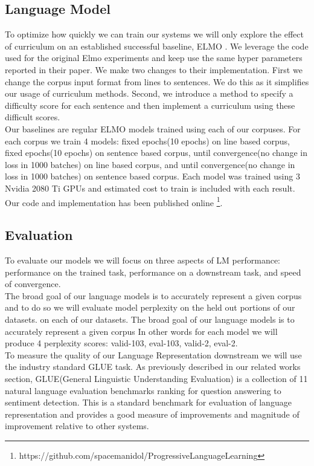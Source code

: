 \subsection{Language Model}
To optimize how quickly we can train our systems we will only explore the effect of curriculum on an established successful baseline, ELMO \cite{Smith2019ContextualWR}. We leverage the code used for the original Elmo experiments and keep use the same hyper parameters reported in their paper. We make two changes to their implementation. First we change the corpus input format from lines to sentences. We do this as it simplifies our usage of curriculum methods. Second, we introduce a method to specify a difficulty score for each sentence and then implement a curriculum using these difficult scores. \\
Our baselines are regular ELMO models trained using each of our corpuses. For each corpus we train 4 models: fixed epochs(10 epochs) on line based corpus, fixed epochs(10 epochs) on sentence based corpus, until convergence(no change in loss in 1000 batches) on line based corpus, and until convergence(no change in loss in 1000 batches) on sentence based corpus. Each model was trained using 3 Nvidia 2080 Ti GPUs and estimated cost to train is included with each result. Our code and implementation has been published online \footnote{https://github.com/spacemanidol/ProgressiveLanguageLearning}. 
\subsection{Evaluation}
To evaluate our models we will focus on three aspects of LM performance: performance on the trained task, performance on a downstream task, and speed of convergence. \\
The broad goal of our language models is to accurately represent a given corpus and to do so we will evaluate model perplexity on the held out portions of our datasets.  on each of our datasets. The broad goal of our language models is to accurately represent a given corpus In other words for each model we will produce 4 perplexity scores: valid-103, eval-103, valid-2, eval-2. \\
To measure the quality of our Language Representation downstream we will use the industry standard GLUE task. As previously described in our related works section, GLUE(General Linguistic Understanding Evaluation) is a collection of 11 natural language evaluation benchmarks ranking for question answering to sentiment detection. This is a standard benchmark for evaluation of language representation and provides a good measure of improvements and magnitude of improvement relative to other systems.  
